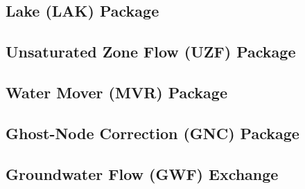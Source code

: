 \subsection{Lake (LAK) Package} \label{sec:lakpak}


\newpage
\subsection{Unsaturated Zone Flow (UZF) Package}


\newpage
\subsection{Water Mover (MVR) Package}


\newpage
\subsection{Ghost-Node Correction (GNC) Package}


\newpage
\subsection{Groundwater Flow (GWF) Exchange}


